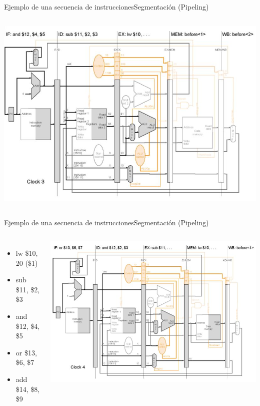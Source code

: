 \documentclass[aspectratio=169,compress]{beamer}
\begin{document}
\begin{footnotesize}
\begin{frame}{Ejemplo de una secuencia de instrucciones}{Segmentación (Pipeling)}
\begin{columns}[onlytextwidth,T]
      \column{100mm}
\includegraphics[scale=0.35]{images/pipeling3.jpg} 
    \end{columns}

\end{frame}

\begin{frame}{Ejemplo de una secuencia de instrucciones}{Segmentación (Pipeling)}

 \begin{columns}[onlytextwidth,T]
      \column{\dimexpr\linewidth-110mm-5mm}

\bigskip
\begin{itemize}
\item lw \$10, 20 (\$1)
\item sub \$11, \$2, \$3
\item and \$12, \$4, \$5
\item or \$13, \$6, \$7
\item add \$14, \$8, \$9
\end{itemize}

      \column{100mm}
\includegraphics[scale=0.35]{images/pipeling4.jpg} 
    \end{columns}


\end{frame}
\end{footnotesize}
\end{document}
